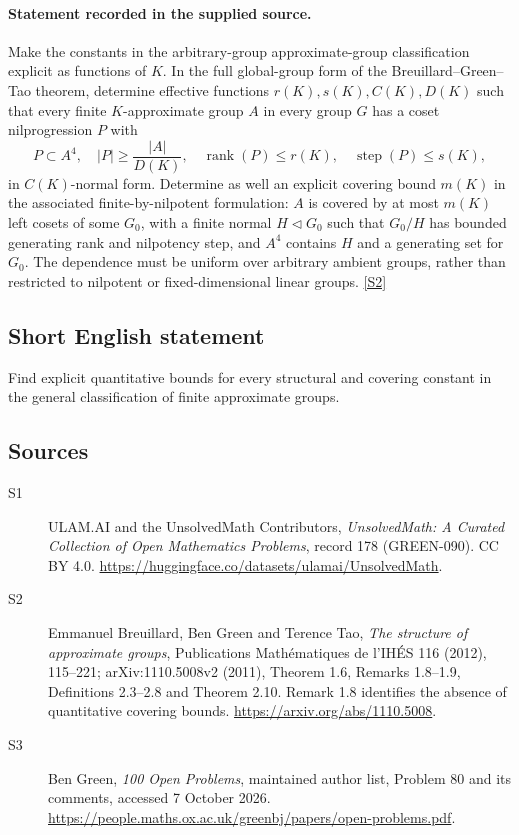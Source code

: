 \documentclass[11pt]{article}
\newcommand{\sref}[2]{\hyperlink{source:#1:#2}{[S#2]}}
\begin{document}
\paragraph{Statement recorded in the supplied source.}
Make the constants in the arbitrary-group approximate-group classification explicit as functions of $K$. In the full global-group form of the Breuillard--Green--Tao theorem, determine effective functions $r(K),s(K),C(K),D(K)$ such that every finite $K$-approximate group $A$ in every group $G$ has a coset nilprogression $P$ with
\[
 P\subset A^4,\quad |P|\geq\frac{|A|}{D(K)},\quad
 \operatorname{rank}(P)\leq r(K),\quad\operatorname{step}(P)\leq s(K),
\]
in $C(K)$-normal form. Determine as well an explicit covering bound $m(K)$ in the associated finite-by-nilpotent formulation: $A$ is covered by at most $m(K)$ left cosets of some $G_0$, with a finite normal $H\triangleleft G_0$ such that $G_0/H$ has bounded generating rank and nilpotency step, and $A^4$ contains $H$ and a generating set for $G_0$. The dependence must be uniform over arbitrary ambient groups, rather than restricted to nilpotent or fixed-dimensional linear groups. \sref{178}{2}
\subsection{Short English statement}
Find explicit quantitative bounds for every structural and covering constant in the general classification of finite approximate groups.
\subsection{Sources}
\begin{description}
\item[\hypertarget{source:178:1}{S1}] ULAM.AI and the UnsolvedMath Contributors, \emph{UnsolvedMath: A Curated Collection of Open Mathematics Problems}, record 178 (GREEN-090). CC BY 4.0. \url{https://huggingface.co/datasets/ulamai/UnsolvedMath}.
\item[\hypertarget{source:178:2}{S2}] Emmanuel Breuillard, Ben Green and Terence Tao, \emph{The structure of approximate groups}, Publications Mathématiques de l’IHÉS 116 (2012), 115--221; arXiv:1110.5008v2 (2011), Theorem 1.6, Remarks 1.8--1.9, Definitions 2.3--2.8 and Theorem 2.10. Remark 1.8 identifies the absence of quantitative covering bounds. \url{https://arxiv.org/abs/1110.5008}.
\item[\hypertarget{source:178:3}{S3}] Ben Green, \emph{100 Open Problems}, maintained author list, Problem 80 and its comments, accessed 7 October 2026. \url{https://people.maths.ox.ac.uk/greenbj/papers/open-problems.pdf}.
\end{description}
\label{end:178}
\end{document}
